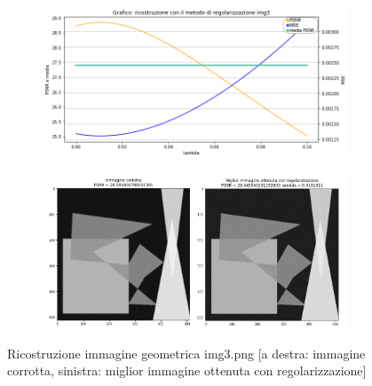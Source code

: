 \begin{figure}[H]
    \begin{subfigure}{0.5\textwidth}
        \includegraphics[width=\textwidth]{imgRicostruzione/grafico3minimize.png}
    \end{subfigure}%
    \begin{subfigure}{0.5\textwidth}
        \centering
        \includegraphics[width=\textwidth]{imgRicostruzione/ricostruzione3minimize.png}
    \end{subfigure}
    \caption{Ricostruzione immagine geometrica img3.png [a destra: immagine corrotta, sinistra: miglior immagine ottenuta con regolarizzazione]}
\end{figure}
